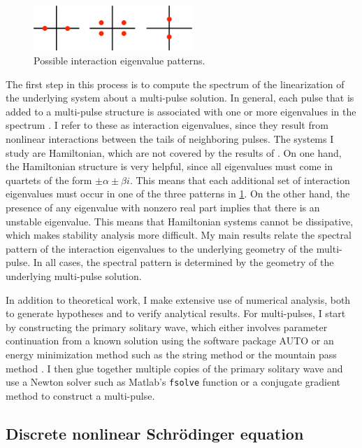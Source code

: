 \documentclass[12pt,reqno,oneside,hidelinks]{article}
\begin{document}
\begin{figure}
    \includegraphics[width=6cm]{images/inteigpattern.eps}
    \caption{Possible interaction eigenvalue patterns.} 
    \label{fig:inteigpattern}
\end{figure}
The first step in this process is to compute the spectrum of the linearization of the underlying system about a multi-pulse solution. In general, each pulse that is added to a multi-pulse structure is associated with one or more eigenvalues in the spectrum \cite{Sandstede1998}. I refer to these as interaction eigenvalues, since they result from nonlinear interactions between the tails of neighboring pulses. The systems I study are Hamiltonian, which are not covered by the results of \cite{Sandstede1998}. On one hand, the Hamiltonian structure is very helpful, since all eigenvalues must come in quartets of the form $\pm \alpha \pm \beta i$. This means that each additional set of interaction eigenvalues must occur in one of the three patterns in \cref{fig:inteigpattern}. On the other hand, the presence of any eigenvalue with nonzero real part implies that there is an unstable eigenvalue. This means that Hamiltonian systems cannot be dissipative, which makes stability analysis more difficult. My main results relate the spectral pattern of the interaction eigenvalues to the underlying geometry of the multi-pulse. In all cases, the spectral pattern is determined by the geometry of the underlying multi-pulse solution. 

In addition to theoretical work, I make extensive use of numerical analysis, both to generate hypotheses and to verify analytical results. For multi-pulses, I start by constructing the primary solitary wave, which either involves parameter continuation from a known solution using the software package AUTO or an energy minimization method such as the string method \cite{Chamard2011} or the mountain pass method \cite{Chen1997}. I then glue together multiple copies of the primary solitary wave and use a Newton solver such as Matlab's \texttt{fsolve} function or a conjugate gradient method to construct a multi-pulse.

\subsection*{Discrete nonlinear Schr\"odinger equation}
\end{document}
